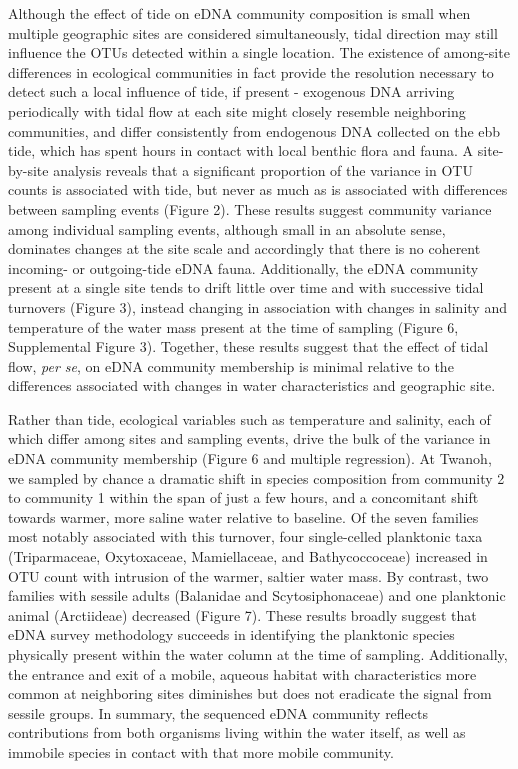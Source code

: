 \documentclass[fleqn,10pt,lineno]{wlpeerj} %
\begin{document}
Although the effect of tide on eDNA community composition is small when
multiple geographic sites are considered simultaneously, tidal direction
may still influence the OTUs detected within a single location. The
existence of among-site differences in ecological communities in fact
provide the resolution necessary to detect such a local influence of
tide, if present - exogenous DNA arriving periodically with tidal flow
at each site might closely resemble neighboring communities, and differ
consistently from endogenous DNA collected on the ebb tide, which has
spent hours in contact with local benthic flora and fauna. A
site-by-site analysis reveals that a significant proportion of the
variance in OTU counts is associated with tide, but never as much as is
associated with differences between sampling events (Figure 2). These
results suggest community variance among individual sampling events,
although small in an absolute sense, dominates changes at the site scale
and accordingly that there is no coherent incoming- or outgoing-tide
eDNA fauna. Additionally, the eDNA community present at a single site
tends to drift little over time and with successive tidal turnovers
(Figure 3), instead changing in association with changes in salinity and
temperature of the water mass present at the time of sampling (Figure 6,
Supplemental Figure 3). Together, these results suggest that the effect
of tidal flow, \emph{per se}, on eDNA community membership is minimal
relative to the differences associated with changes in water
characteristics and geographic site.

Rather than tide, ecological variables such as temperature and salinity,
each of which differ among sites and sampling events, drive the bulk of
the variance in eDNA community membership (Figure 6 and multiple
regression). At Twanoh, we sampled by chance a dramatic shift in species
composition from community 2 to community 1 within the span of just a
few hours, and a concomitant shift towards warmer, more saline water
relative to baseline. Of the seven families most notably associated with
this turnover, four single-celled planktonic taxa (Triparmaceae,
Oxytoxaceae, Mamiellaceae, and Bathycoccoceae) increased in OTU count
with intrusion of the warmer, saltier water mass. By contrast, two
families with sessile adults (Balanidae and Scytosiphonaceae) and one
planktonic animal (Arctiideae) decreased (Figure 7). These results
broadly suggest that eDNA survey methodology succeeds in identifying the
planktonic species physically present within the water column at the
time of sampling. Additionally, the entrance and exit of a mobile,
aqueous habitat with characteristics more common at neighboring sites
diminishes but does not eradicate the signal from sessile groups. In
summary, the sequenced eDNA community reflects contributions from both
organisms living within the water itself, as well as immobile species in
contact with that more mobile community.
\end{document}
